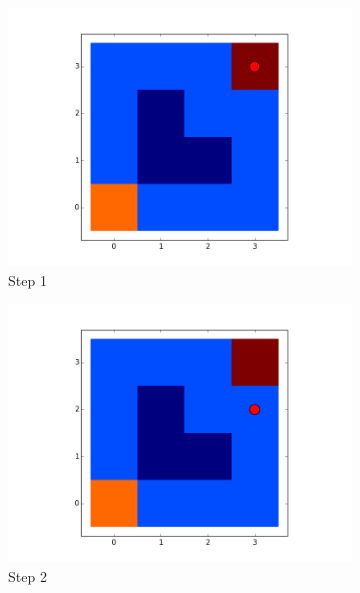 \documentclass[paper=a4, fontsize=11pt]{scrartcl}
\numberwithin{equation}{section}		%
\numberwithin{figure}{section}			%
\numberwithin{table}{section}		    %
\begin{document}
	\begin{figure}[H]
		\begin{subfigure}[b]{0.5\textwidth}
			\includegraphics[width=\textwidth]{move_ex_1_step_01}
			\caption{Step 1}
			\label{fig:1}
		\end{subfigure}
		\begin{subfigure}[b]{0.5\textwidth}
			\includegraphics[width=\textwidth]{move_ex_1_step_02}
			\caption{Step 2}
			\label{fig:2}
		\end{subfigure}
		\begin{subfigure}[b]{0.5\textwidth}

\end{subfigure}
\end{figure}
\end{document}
